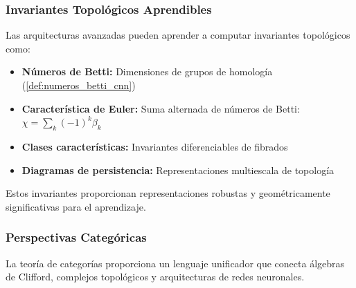 \subsubsection{Invariantes Topológicos Aprendibles}

Las arquitecturas avanzadas pueden aprender a computar invariantes topológicos como:
\begin{itemize}
    \item \textbf{Números de Betti:} Dimensiones de grupos de homología (\autoref{def:numeros_betti_cnn})
    \item \textbf{Característica de Euler:} Suma alternada de números de Betti: $\chi = \sum_k (-1)^k \beta_k$
    \item \textbf{Clases características:} Invariantes diferenciables de fibrados
    \item \textbf{Diagramas de persistencia:} Representaciones multiescala de topología
\end{itemize}

Estos invariantes proporcionan representaciones robustas y geométricamente significativas para el aprendizaje.

\subsubsection{Perspectivas Categóricas}

La teoría de categorías proporciona un lenguaje unificador que conecta álgebras de Clifford, complejos topológicos y arquitecturas de redes neuronales.

